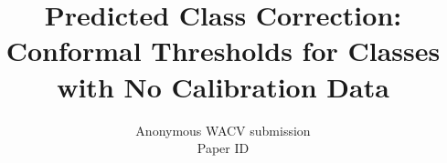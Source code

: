 \documentclass[10pt,twocolumn,letterpaper]{article}
\title{Predicted Class Correction: Conformal Thresholds for Classes\\with No Calibration Data}
\author{Anonymous WACV submission\\
Paper ID \wacvPaperID
}
\begin{document}
\maketitle









{
    \small
    
    
}

\clearpage

\end{document}
